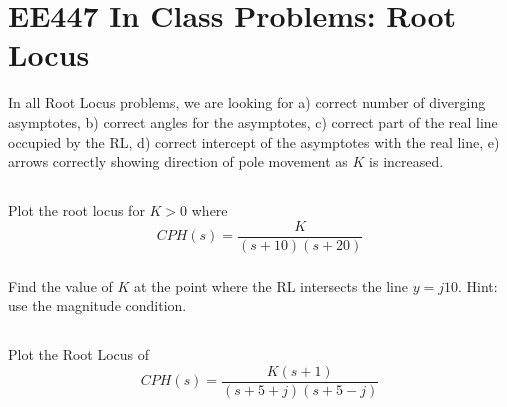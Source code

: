 \documentclass{article}	%
\begin{document}
\newpage
\section{EE447 In Class Problems: Root Locus}

In all Root Locus problems, we are looking for a) correct number of diverging asymptotes, b) correct angles for the asymptotes, c) correct part of the real line occupied by the RL, d) correct intercept of the asymptotes with the real line, e) arrows correctly showing direction of pole movement as $K$ is increased.

\subsection{}

\subsubsection{}
\label{xx1} Plot the root locus for $K>0$ where
\[
CPH(s) = \frac{K}{(s+10)(s+20)}
\]






\subsubsection{}  Find the value of $K$ at the point where the RL intersects the line $y=j10$.  Hint: use the magnitude condition.

%
%



\subsection{}  Plot the Root Locus of
\[
CPH(s) = \frac{K(s+1)}{(s+5+j)(s+5-j)}
\]
\end{document}

